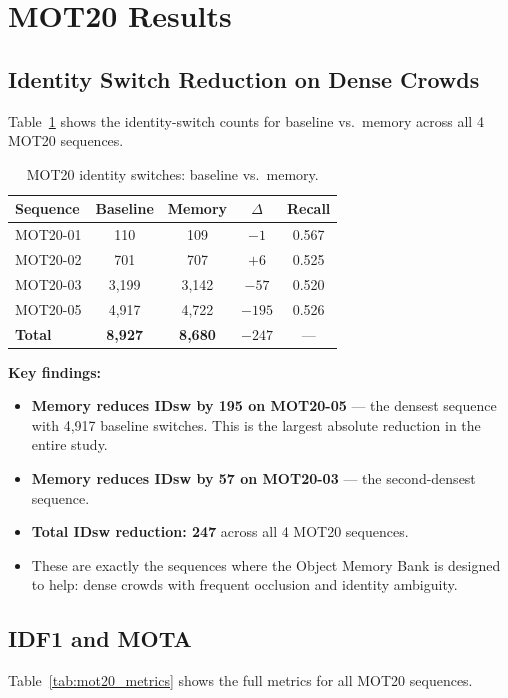 \documentclass[11pt,a4paper]{article}
\begin{document}
\section{MOT20 Results}

\subsection{Identity Switch Reduction on Dense Crowds}
Table~\ref{tab:mot20_idsw} shows the identity-switch counts for baseline vs.\ memory across all 4 MOT20 sequences.

\begin{table}[H]
\centering
\caption{MOT20 identity switches: baseline vs.\ memory.}
\label{tab:mot20_idsw}
\begin{tabular}{@{}lcccc@{}}
\toprule
\textbf{Sequence} & \textbf{Baseline} & \textbf{Memory} & $\Delta$ & \textbf{Recall} \\
\midrule
MOT20-01 & 110 & 109 & $-1$ & 0.567 \\
MOT20-02 & 701 & 707 & $+6$ & 0.525 \\
MOT20-03 & 3{,}199 & 3{,}142 & $-57$ & 0.520 \\
MOT20-05 & 4{,}917 & 4{,}722 & $-195$ & 0.526 \\
\midrule
\textbf{Total} & \textbf{8{,}927} & \textbf{8{,}680} & \textbf{$-247$} & --- \\
\bottomrule
\end{tabular}
\end{table}

\textbf{Key findings:}
\begin{itemize}[leftmargin=2em]
    \item \textbf{Memory reduces IDsw by 195 on MOT20-05} --- the densest sequence with 4{,}917 baseline switches. This is the largest absolute reduction in the entire study.
    \item \textbf{Memory reduces IDsw by 57 on MOT20-03} --- the second-densest sequence.
    \item \textbf{Total IDsw reduction: 247} across all 4 MOT20 sequences.
    \item These are exactly the sequences where the Object Memory Bank is designed to help: dense crowds with frequent occlusion and identity ambiguity.
\end{itemize}

\subsection{IDF1 and MOTA}
Table~\ref{tab:mot20_metrics} shows the full metrics for all MOT20 sequences.
\end{document}

